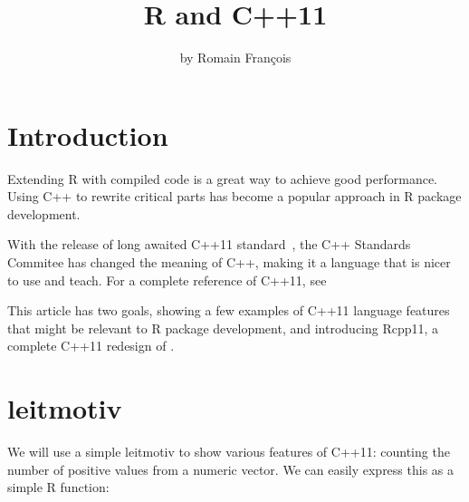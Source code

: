 \title{R and C++11}
\author{by Romain François}

\maketitle


\section{Introduction}

Extending R with compiled code is a great way to achieve good performance. 
Using C++ to rewrite critical parts has become a popular approach
in R package development. 

With the release of long awaited C++11 standard~\citep{Cpp11}, 
the C++ Standards Commitee has changed the meaning of C++, making it 
a language that is nicer to use and teach. For a complete 
reference of C++11, see~\citep{Stroustrup2013}

This article has two goals, 
showing a few examples of C++11 language features that might be 
relevant to R package development, and introducing
Rcpp11, a complete C++11 redesign of . 

\section{leitmotiv}

We will use a simple leitmotiv to show various features of C++11: counting 
the number of positive values from a numeric vector. We can easily express
this as a simple R function:

